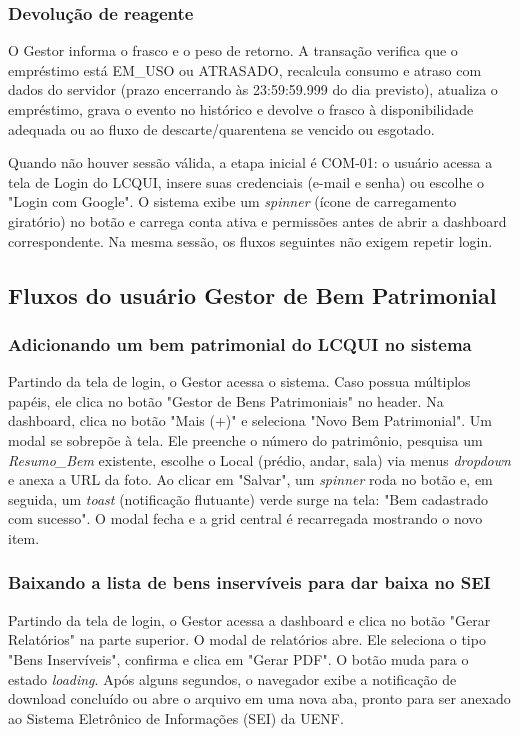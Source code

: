 \subsubsection{Devolução de reagente}
O Gestor informa o frasco e o peso de retorno. A transação verifica que o empréstimo está EM\_USO ou ATRASADO, recalcula consumo e atraso com dados do servidor (prazo encerrando às 23:59:59.999 do dia previsto), atualiza o empréstimo, grava o evento no histórico e devolve o frasco à disponibilidade adequada ou ao fluxo de descarte/quarentena se vencido ou esgotado.

\begin{explicacao}
Quando não houver sessão válida, a etapa inicial é COM-01: o usuário acessa a tela de Login do LCQUI, insere suas credenciais (e-mail e senha) ou escolhe o "Login com Google". O sistema exibe um \textit{spinner} (ícone de carregamento giratório) no botão e carrega conta ativa e permissões antes de abrir a dashboard correspondente. Na mesma sessão, os fluxos seguintes não exigem repetir login.
\end{explicacao}

\subsection{Fluxos do usuário Gestor de Bem Patrimonial}

\subsubsection{Adicionando um bem patrimonial do LCQUI no sistema}
Partindo da tela de login, o Gestor acessa o sistema. Caso possua múltiplos papéis, ele clica no botão "Gestor de Bens Patrimoniais" no header. Na dashboard, clica no botão "Mais (+)" e seleciona "Novo Bem Patrimonial". Um modal se sobrepõe à tela. Ele preenche o número do patrimônio, pesquisa um \textit{Resumo\_Bem} existente, escolhe o Local (prédio, andar, sala) via menus \textit{dropdown} e anexa a URL da foto. Ao clicar em "Salvar", um \textit{spinner} roda no botão e, em seguida, um \textit{toast} (notificação flutuante) verde surge na tela: "Bem cadastrado com sucesso". O modal fecha e a grid central é recarregada mostrando o novo item.

\subsubsection{Baixando a lista de bens inservíveis para dar baixa no SEI}
Partindo da tela de login, o Gestor acessa a dashboard e clica no botão "Gerar Relatórios" na parte superior. O modal de relatórios abre. Ele seleciona o tipo "Bens Inservíveis", confirma e clica em "Gerar PDF". O botão muda para o estado \textit{loading}. Após alguns segundos, o navegador exibe a notificação de download concluído ou abre o arquivo em uma nova aba, pronto para ser anexado ao Sistema Eletrônico de Informações (SEI) da UENF.

